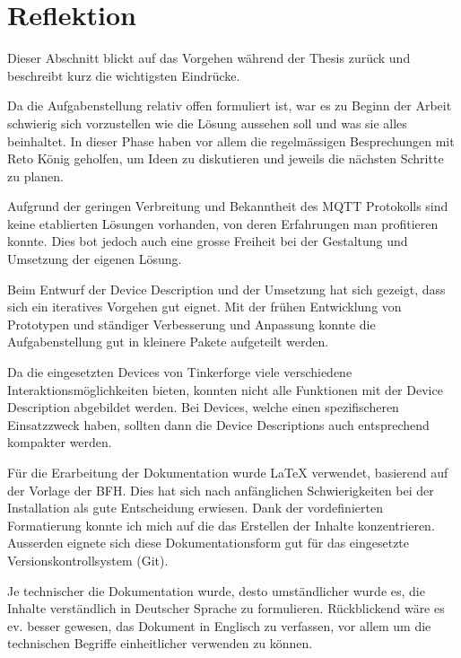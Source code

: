 \section{Reflektion}

Dieser Abschnitt blickt auf das Vorgehen während der Thesis zurück und beschreibt kurz die wichtigsten Eindrücke.

Da die Aufgabenstellung relativ offen formuliert ist, war es zu Beginn der Arbeit schwierig sich vorzustellen wie die Lösung aussehen soll und was sie alles beinhaltet. In dieser Phase haben vor allem die regelmässigen Besprechungen mit Reto König geholfen, um Ideen zu diskutieren und jeweils die nächsten Schritte zu planen.

Aufgrund der geringen Verbreitung und Bekanntheit des MQTT Protokolls sind keine etablierten Lösungen vorhanden, von deren Erfahrungen man profitieren konnte. Dies bot jedoch auch eine grosse Freiheit bei der Gestaltung und Umsetzung der eigenen Lösung.

Beim Entwurf der Device Description und der Umsetzung hat sich gezeigt, dass sich ein iteratives Vorgehen   gut eignet. Mit der frühen Entwicklung von Prototypen und ständiger Verbesserung und Anpassung konnte die Aufgabenstellung gut in kleinere Pakete aufgeteilt werden.

Da die eingesetzten Devices von Tinkerforge viele verschiedene Interaktionsmöglichkeiten bieten, konnten nicht alle Funktionen mit der Device Description abgebildet werden. Bei Devices, welche einen spezifischeren Einsatzzweck haben, sollten dann die Device Descriptions auch entsprechend kompakter werden.


Für die Erarbeitung der Dokumentation wurde LaTeX verwendet, basierend auf der Vorlage der BFH. Dies hat sich nach anfänglichen Schwierigkeiten bei der Installation als gute Entscheidung erwiesen. Dank der vordefinierten Formatierung konnte ich mich auf die das Erstellen der Inhalte konzentrieren. Ausserden eignete sich diese Dokumentationsform gut für das eingesetzte Versionskontrollsystem (Git).

Je technischer die Dokumentation wurde, desto umständlicher wurde es, die Inhalte verständlich in Deutscher Sprache zu formulieren. Rückblickend wäre es ev. besser gewesen, das Dokument in Englisch zu verfassen, vor allem um die technischen Begriffe einheitlicher verwenden zu können.
